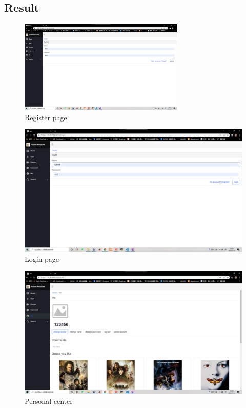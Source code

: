 \begin{CJK*}{UTF8}{gbsn}
\section{Result}



\begin{figure}[htbp]
\centering
\includegraphics[width=0.7\textwidth]{reg.png}
\caption{Register page}
\end{figure}


\begin{figure}[htbp]
\centering
\includegraphics[width=1\textwidth]{res_login.png}
\caption{Login page}
\end{figure}




\begin{figure}[htbp]
\centering
\includegraphics[width=1\textwidth]{res_ps.png}
\caption{Personal center}
\end{figure}



\end{CJK*}
